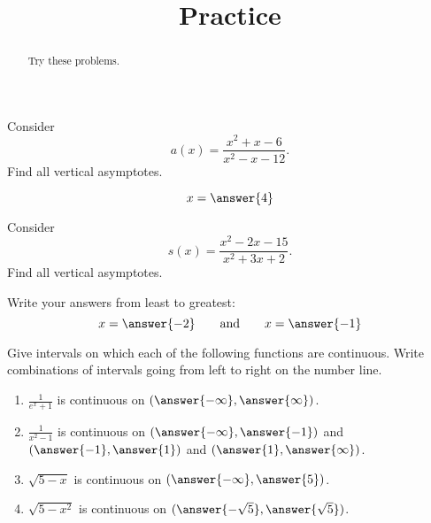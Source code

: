 \documentclass{ximera}
\title{Practice}
\begin{document}
\begin{abstract}
  Try these problems.
\end{abstract}
\maketitle


\begin{exercise}
Consider 
\[a(x) = \frac{x^2+x-6}{x^2-x-12}.
\]
Find all vertical asymptotes.
\begin{prompt}
\begin{multipleChoice}
\end{multipleChoice}
\begin{exercise} 
\[
x=\answer{4}
\]
\end{exercise}
\end{prompt}
\end{exercise}

\begin{exercise}
Consider 
\[s(x) = \frac{x^2-2 x-15}{x^2+3 x+2}.
\]
Find all vertical asymptotes.
\begin{prompt}
\begin{multipleChoice}
\end{multipleChoice}
\begin{exercise}Write your answers from least to greatest:
\[
x=\answer{-2}\qquad\text{and}\qquad x=\answer{-1}
\]
\end{exercise}
\end{prompt}
\end{exercise}


\begin{exercise}



Give intervals on which each of the following functions are
continuous. Write combinations of intervals going from left to right
on the number line.

\begin{enumerate}
\item $\frac{1}{e^x+1}$ is continuous on $(\answer{-\infty},\answer{\infty})$.
\item $\frac{1}{x^2-1}$ is continuous on $(\answer{-\infty},\answer{-1})$ and $(\answer{-1},\answer{1})$ and $(\answer{1},\answer{\infty})$.
\item $\sqrt{5-x}$ is continuous on $(\answer{-\infty},\answer{5})$.
\item $\sqrt{5-x^2}$ is continuous on $(\answer{-\sqrt{5}},\answer{\sqrt{5}})$.
\end{enumerate}

\end{exercise}
\end{document}
